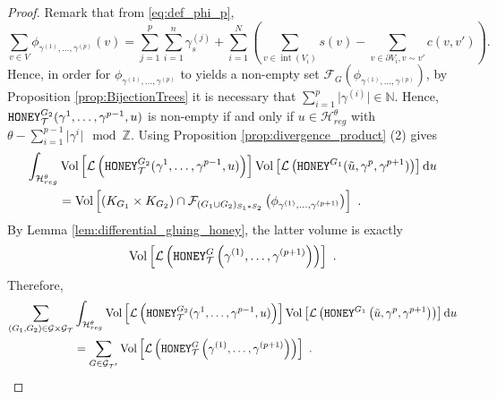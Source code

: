 \documentclass[11pt,a4paper]{amsart}
\providecommand{\diff}{\mathrm d}
\providecommand{\Vol}{\operatorname{Vol}}
\providecommand{\honey}{\texttt{\textsc{HONEY}}}
\DeclareMathOperator{\interior}{int}
\numberwithin{equation}{section}
\theoremstyle{definition}
\begin{document}
\begin{proof}
Remark that from \eqref{eq:def_phi_p},
$$\sum_{v\in V}\phi_{\gamma^{(1)},\ldots,\gamma^{(p)}}(v) = 
\sum_{j=1}^p\sum_{i=1}^n\gamma_s^{(j)}+\sum_{i=1}^N 
\left(\sum_{v\in \interior(V_i)}s(v)-\sum_{v\in\partial V_i, v\sim v'} 
c(v,v')\right).$$
Hence, in order for $\phi_{\gamma^{(1)},\ldots,\gamma^{(p)}}$ 
to yields a non-empty set $\mathcal{F}_{G}(\phi_{\gamma^{(1)}, 
\ldots,\gamma^{(p)}})$, 
by Proposition \ref{prop:BijectionTrees} it is necessary that 
$\sum_{i=1}^p\vert\gamma^{(i)}\vert\in \mathbb{N}$. 
Hence, $\honey_{\mathcal{T}}^{G_2}(\gamma^1,\ldots,\gamma^{p-1},u)$ 
is non-empty if and only if $u\in\mathcal{H}_{reg}^\theta$ with 
$\theta-\sum_{i=1}^{p-1}\vert \gamma^i\vert\mod \mathbb{Z}$. 
Using Proposition \ref{prop:divergence_product} (2) gives
\begin{align*}
\int_{\mathcal{H}_{reg}^{\theta} } 
    & \Vol \left[ \mathcal{L}\left(\honey_{\mathcal{T}}^{G_2}
    (\gamma^1,\ldots,\gamma^{p-1},u)\right) \right] 
    \Vol \left[ \mathcal{L}\left(\honey^{G_1} 
    (\tilde{u},\gamma^p,\gamma^{p+1})\right) \right] \diff u \\
&= \Vol\left[(K_{G_1}\times K_{G_2})\cap 
\mathcal{F}_{(G_1 \cup G_2)_{S_1 * S_2}} 
\left(\phi_{\gamma^{(1)},\ldots,\gamma^{(p+1)}}\right)\right] \ .
\end{align*}
By Lemma \ref{lem:differential_gluing_honey}, 
the latter volume is exactly
\begin{equation*}
    \Vol \left[\mathcal{L}\left( \honey_{\mathcal{T}}^G \left(\gamma^{(1)}, 
    \ldots,\gamma^{(p+1)}\right) \right) \right] \ .
\end{equation*}
Therefore, 
\begin{align*}
\sum_{(G_1,G_2)\in\mathcal{G}\times\mathcal{G}_{\mathcal{T}}} 
&\int_{\mathcal{H}_{reg}^{\theta} } 
     \Vol \left[ \mathcal{L}\left(\honey_{\mathcal{T}}^{G_2}
    (\gamma^1,\ldots,\gamma^{p-1},u)\right) \right] 
    \Vol \left[ \mathcal{L}\left(\honey^{G_1} 
    \left(\tilde{u},\gamma^p,\gamma^{p+1}\right)\right) \right] \diff u\\
&= \sum_{G\in\mathcal{G}_{\mathcal{T}'}} 
\Vol \left[\mathcal{L}\left( \honey_{\mathcal{T}}^G \left(\gamma^{(1)}, 
    \ldots,\gamma^{(p+1)}\right) \right) \right] \ .
\end{align*}
\end{proof}
\end{document}
